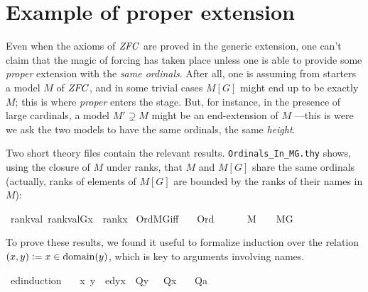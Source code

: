 \section{Example of proper extension}
\label{sec:example-proper-extension}

Even when the axioms of $\mathit{ZFC}$ are proved in the generic extension,
one can't claim that the magic of forcing has taken place unless one
is able to provide some \emph{proper} extension with the \emph{same
ordinals}. After all, one is assuming from starters a model $M$ of $\mathit{ZFC}$,
and in some trivial cases $M[G]$ might end up to be exactly $M$; this
is where \emph{proper} enters the stage. But, for instance, in the
presence of large cardinals, a model $M'\supsetneq M$ might be an
end-extension of $M$ ---this is were we ask the two models to have the
same ordinals, the same \emph{height}. 

Two short theory files contain the relevant
results. \texttt{Ordinals\_In\_MG.thy} shows, using the closure of $M$
under ranks, that $M$ and $M[G]$ share the same ordinals (actually,
ranks of elements of $M[G]$ are bounded by the ranks of their names in
$M$):
\begin{isabelle}
\isamarkupfalse%
\ rank{\isacharunderscore}val{\isacharcolon}\ {\isachardoublequoteopen}rank{\isacharparenleft}val{\isacharparenleft}G{\isacharcomma}x{\isacharparenright}{\isacharparenright}\ {\isasymle}\ rank{\isacharparenleft}x{\isacharparenright}{\isachardoublequoteclose}\isanewline
{}\isamarkupfalse%
\ Ord{\isacharunderscore}MG{\isacharunderscore}iff{\isacharcolon}\isanewline
\ \ \ {\isachardoublequoteopen}Ord{\isacharparenleft}{\isasymalpha}{\isacharparenright}{\isachardoublequoteclose}\ \isanewline
\ \ \ {\isachardoublequoteopen}{\isasymalpha}\ {\isasymin}\ M\ {\isasymlongleftrightarrow}\ {\isasymalpha}\ {\isasymin}\ M{\isacharbrackleft}G{\isacharbrackright}{\isachardoublequoteclose}
\end{isabelle}

To prove these results, we found it useful to formalize induction over
the relation $(x,y) \mathrel{\mathop:}= x\in\operatorname{domain}(y)$, which is key
to arguments involving names.
\begin{isabelle}
\isamarkupfalse%
\ ed{\isacharunderscore}induction{\isacharcolon}\isanewline
\ \ \ {\isachardoublequoteopen}{\isasymAnd}x{\isachardot}\ {\isasymlbrakk}{\isasymAnd}y{\isachardot}\ \ ed{\isacharparenleft}y{\isacharcomma}x{\isacharparenright}\ {\isasymLongrightarrow}\ Q{\isacharparenleft}y{\isacharparenright}\ {\isasymrbrakk}\ {\isasymLongrightarrow}\ Q{\isacharparenleft}x{\isacharparenright}{\isachardoublequoteclose}\isanewline
\ \ \ {\isachardoublequoteopen}Q{\isacharparenleft}a{\isacharparenright}{\isachardoublequoteclose}
\end{isabelle}

